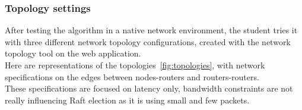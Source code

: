 \documentclass{eplmastersthesis}
\begin{document}
        \subsubsection{Topology settings}

          After testing the algorithm in a native network environment,
          the student tries it with three different network
          topology configurations, created with the network topology tool on
          the web application.\\
          Here are representations of the topologies~\ref{fig:topologies},
          with network specifications on the edges between nodes-routers and
          routers-routers.\\
          These specifications are focused on latency only,
          bandwidth constraints are not really influencing Raft election as
          it is using small and few packets.
\end{document}
